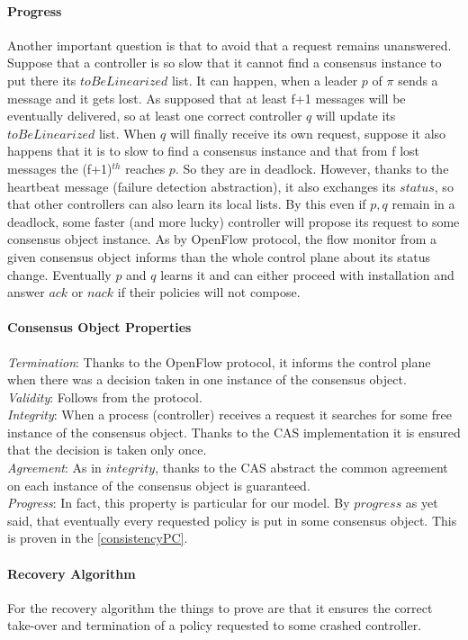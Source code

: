 \documentclass{article}
\theoremstyle{remark}
\begin{document}
\paragraph{Progress} Another important question is that to avoid that a request remains unanswered. Suppose that a controller is so slow that it cannot find a consensus instance to put there its $toBeLinearized$ list. It can happen, when a leader $p$ of $\pi$ sends a message and it gets lost. As supposed that at least f+1 messages will be eventually delivered, so at least one correct controller $q$ will update its $toBeLinearized$ list. When $q$ will finally receive its own request, suppose it also happens that it is to slow to find a consensus instance and that from f lost messages the (f+1)$^{th}$ reaches $p$. So they are in deadlock. However, thanks to the heartbeat message (failure detection abstraction), it also exchanges its $status$, so that other controllers can also learn its local lists. By this even if $p,q$ remain in a deadlock, some faster (and more lucky) controller will propose its request to some consensus object instance. As by OpenFlow protocol, the flow monitor from a given consensus object informs than the whole control plane about its status change. Eventually $p$ and $q$ learns it and can either proceed with installation and answer $ack$ or $nack$ if their policies will not compose.
\paragraph{Consensus Object Properties}
\emph{Termination}: Thanks to the OpenFlow protocol, it informs the control plane when there was a decision taken in one instance of the consensus object. 
\\
\emph{Validity}: Follows from the protocol.
\\
\emph{Integrity}: When a process (controller) receives a request it searches for some free instance of the consensus object. Thanks to the CAS implementation it is ensured that the decision is taken only once.
\\
\emph{Agreement}: As in $integrity$, thanks to the CAS abstract the common agreement on each instance of the consensus object is guaranteed.
\\
\emph{Progress}: In fact, this property is particular for our model. By $progress$ as yet said, that eventually every requested policy is put in some consensus object. This is proven in the \ref{consistencyPC}.
\paragraph{Recovery Algorithm}
For the recovery algorithm the things to prove are that it ensures the correct take-over and termination of a policy requested to some crashed controller. 
\end{document}
